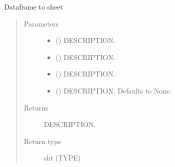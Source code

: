 \documentclass[letterpaper,10pt,english]{sphinxmanual}
\begin{document}
\begin{fulllineitems}
\label{\detokenize{onboard/model_Excel:model_Excel.df_to_sheet}}
\pysigstartsignatures
{}
\pysigstopsignatures
\sphinxAtStartPar
Dataframe to sheet
\begin{quote}\begin{description}
\item[{Parameters}] \leavevmode\begin{itemize}
\item {} 
\sphinxAtStartPar
{} () \textendash{} DESCRIPTION.

\item {} 
\sphinxAtStartPar
{} () \textendash{} DESCRIPTION.

\item {} 
\sphinxAtStartPar
{} () \textendash{} DESCRIPTION.

\item {} 
\sphinxAtStartPar
{} (\sphinxstyleliteralemphasis{\sphinxupquote{, }}) \textendash{} DESCRIPTION. Defaults to None.

\end{itemize}

\item[{Returns}] \leavevmode
\sphinxAtStartPar
DESCRIPTION.

\item[{Return type}] \leavevmode
\sphinxAtStartPar
sht (TYPE)

\end{description}\end{quote}

\end{fulllineitems}

\end{document}
